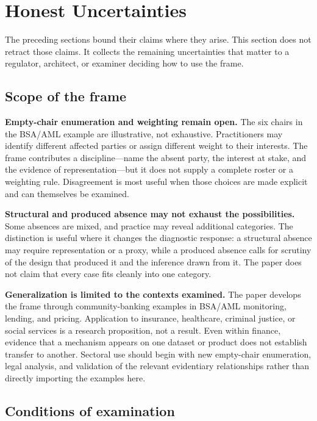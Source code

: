 
\section{Honest Uncertainties}
\label{sec:uncertainties}

The preceding sections bound their claims where they arise. This section does
not retract those claims. It collects the remaining uncertainties that matter
to a regulator, architect, or examiner deciding how to use the frame.

\subsection{Scope of the frame}

\textbf{Empty-chair enumeration and weighting remain open.} The six chairs in
the BSA/AML example are illustrative, not exhaustive. Practitioners may identify
different affected parties or assign different weight to their interests. The
frame contributes a discipline---name the absent party, the interest at stake,
and the evidence of representation---but it does not supply a complete roster
or a weighting rule. Disagreement is most useful when those choices are made
explicit and can themselves be examined.

\textbf{Structural and produced absence may not exhaust the possibilities.}
Some absences are mixed, and practice may reveal additional categories. The
distinction is useful where it changes the diagnostic response: a structural
absence may require representation or a proxy, while a produced absence calls
for scrutiny of the design that produced it and the inference drawn from it.
The paper does not claim that every case fits cleanly into one category.

\textbf{Generalization is limited to the contexts examined.} The paper develops
the frame through community-banking examples in BSA/AML monitoring, lending,
and pricing. Application to insurance, healthcare, criminal justice, or social
services is a research proposition, not a result. Even within finance, evidence
that a mechanism appears on one dataset or product does not establish transfer
to another. Sectoral use should begin with new empty-chair enumeration, legal
analysis, and validation of the relevant evidentiary relationships rather than
directly importing the examples here.

\subsection{Conditions of examination}


